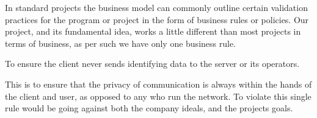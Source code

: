 In standard projects the business model can commonly outline certain validation 
practices for the program or project in the form of business rules or policies. 
Our project, and its fundamental idea, works a little different than most 
projects in terms of business, as per such we have only one business rule.

To ensure the client never sends identifying data to the server or its 
operators.

This is to ensure that the privacy of communication is always within the hands 
of the client and user, as opposed to any who run the network. To violate this 
single rule would be going against both the company ideals, and the projects 
goals.
